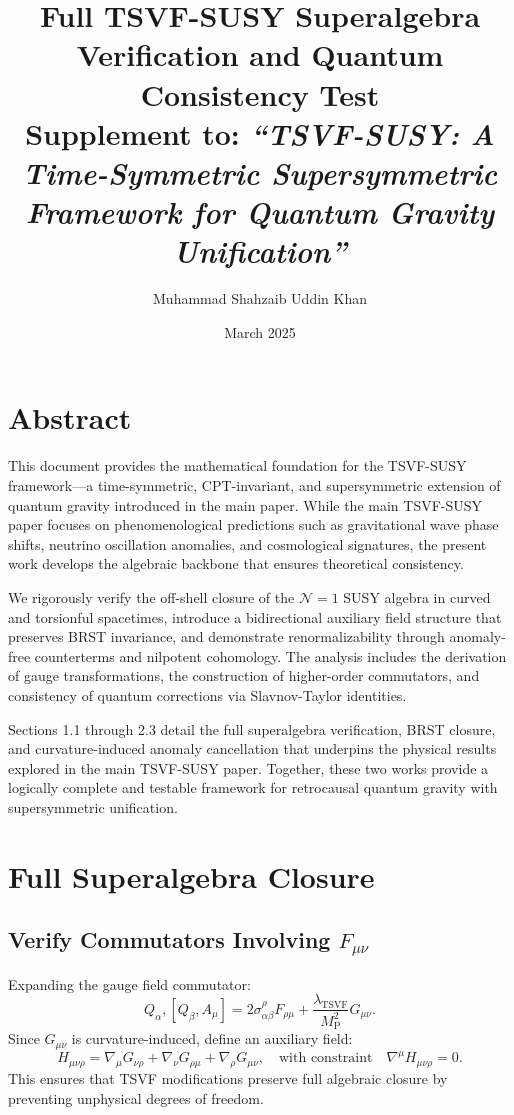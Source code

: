 \documentclass[12pt, onecolumn]{article}
\title{\textbf{Full TSVF-SUSY Superalgebra Verification and Quantum Consistency Test} \\[0.5em]
\large Supplement to: \emph{“TSVF-SUSY: A Time-Symmetric Supersymmetric Framework for Quantum Gravity Unification”}}
\author{Muhammad Shahzaib Uddin Khan}
\date{March 2025}
\theoremstyle{definition}
\newcommand{\tsvf}{\lambda_{\mathrm{TSVF}}}
\newcommand{\Mp}{M_{\mathrm{P}}}
\numberwithin{equation}{section}
\begin{document}
\maketitle

\vspace{1.5em}

\section*{Abstract}

This document provides the mathematical foundation for the TSVF-SUSY framework—a time-symmetric, CPT-invariant, and supersymmetric extension of quantum gravity introduced in the main paper. While the main TSVF-SUSY paper focuses on phenomenological predictions such as gravitational wave phase shifts, neutrino oscillation anomalies, and cosmological signatures, the present work develops the algebraic backbone that ensures theoretical consistency.

We rigorously verify the off-shell closure of the \( \mathcal{N}=1 \) SUSY algebra in curved and torsionful spacetimes, introduce a bidirectional auxiliary field structure that preserves BRST invariance, and demonstrate renormalizability through anomaly-free counterterms and nilpotent cohomology. The analysis includes the derivation of gauge transformations, the construction of higher-order commutators, and consistency of quantum corrections via Slavnov-Taylor identities.

Sections 1.1 through 2.3 detail the full superalgebra verification, BRST closure, and curvature-induced anomaly cancellation that underpins the physical results explored in the main TSVF-SUSY paper. Together, these two works provide a logically complete and testable framework for retrocausal quantum gravity with supersymmetric unification.

\newpage


\section{Full Superalgebra Closure}

\subsection{Verify Commutators Involving \texorpdfstring{$F_{\mu\nu}$}{Verify Commutators for F}}
Expanding the gauge field commutator:
\begin{equation}
{Q_\alpha, [Q_\beta, A_\mu]} = 2 \sigma^\rho_{\alpha\beta} F_{\rho\mu} + \frac{\tsvf}{\Mp^2} G_{\mu\nu}.
\end{equation}
Since $G_{\mu\nu}$ is curvature-induced, define an auxiliary field:
\begin{equation}
H_{\mu\nu\rho} = \nabla_\mu G_{\nu\rho} + \nabla_\nu G_{\rho\mu} + \nabla_\rho G_{\mu\nu}, \quad \text{with constraint} \quad \nabla^{\mu} H_{\mu\nu\rho} = 0.
\end{equation}
This ensures that TSVF modifications preserve full algebraic closure by preventing unphysical degrees of freedom.
\end{document}
